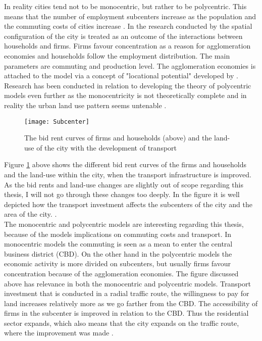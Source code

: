 In reality cities tend not to be monocentric, but rather to be polycentric. This means that the number of employment subcenters increase as the population and the commuting costs of cities increase \citep{mcmillen}. In the research conducted by \cite{fujita} the spatial configuration of the city is treated as an outcome of the interactions between households and firms. Firms favour concentration as a reason for agglomeration economies and households follow the employment distribution. The main parameters are commuting and production level. The agglomeration economies is attached to the model via a concept of "locational potential" developed by \cite{fujita}. Research has been conducted in relation to developing the theory of polycentric models even further as the monocentricity is not theoretically complete and in reality the urban land use pattern seems untenable \citep{fujita}. \\
\begin{figure}[H]
\centering
\texttt{[image: Subcenter]}
\caption{The bid rent curves of firms and households (above) and the land-use of the city with the development of transport \citep{hsl}}
\label{fig:Subcenter}
\end{figure}

Figure \ref{fig:Subcenter} above shows the different bid rent curves of the firms and households and the land-use within the city, when the transport infrastructure is improved. As the bid rents and land-use changes are slightly out of scope regarding this thesis, I will not go through these changes too deeply. In the figure it is well depicted how the transport investment affects the subcenters of the city and the area of the city.  \citep{hsl}. \\

The monocentric and polycentric models are interesting regarding this thesis, because of the models implications on commuting costs and transport. In monocentric models the commuting is seen as a mean to enter the central business district (CBD). On the other hand in the polycentric models the economic activity is more divided on subcenters, but usually firms favour concentration because of the agglomeration economies. The figure discussed above has relevance in both the monocentric and polycentric models. Transport investment that is conducted in a radial traffic route, the willingness to pay for land increases relatively more as we go farther from the CBD. The accessibility of firms in the subcenter is improved in relation to the CBD. Thus the residential sector expands, which also means that the city expands on the traffic route, where the improvement was made \citep{hsl}.  \\

